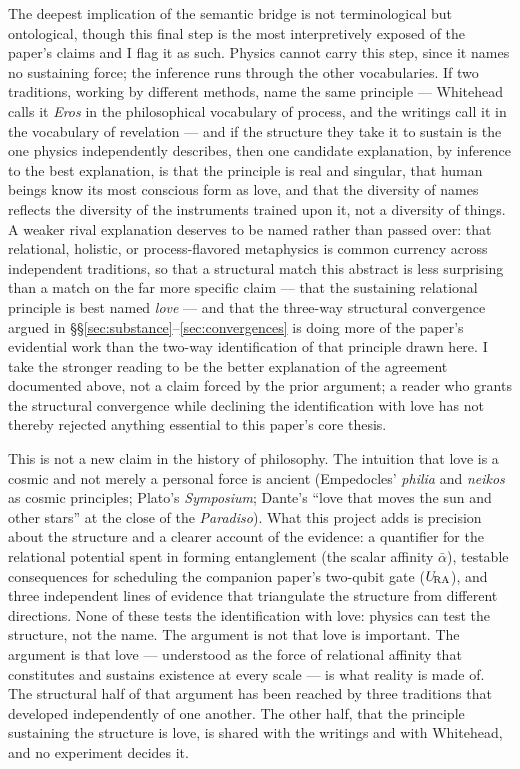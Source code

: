 The deepest implication of the semantic bridge is not terminological
but ontological, though this final step is the most interpretively
exposed of the paper's claims and I flag it as such.
Physics cannot carry this step, since it names no sustaining force; the
inference runs through the other vocabularies.
If two traditions, working by different methods, name the same
principle --- Whitehead calls it \emph{Eros} in the philosophical vocabulary of
process, and the \bahai writings call it \mahabbat in the vocabulary of
revelation --- and if the structure they take it to sustain is the one
physics independently describes, then one candidate explanation, by
inference to the best explanation, is that the principle is real and
singular, that human beings know its most conscious form as love, and
that the diversity of names reflects the diversity of the instruments
trained upon it, not a diversity of things.
A weaker rival explanation deserves to be named rather than passed over:
that relational, holistic, or process-flavored metaphysics is common
currency across independent traditions, so that a structural match
this abstract is less surprising than a match on the far more specific
claim --- that the sustaining relational principle is best named
\emph{love} --- and that the three-way structural convergence
argued in \S\S\ref{sec:substance}--\ref{sec:convergences} is
doing more of the paper's evidential work than the two-way
identification of that principle drawn here.
I take the stronger reading to be the better explanation of the agreement
documented above, not a claim forced by the prior argument; a reader who
grants the structural convergence while declining the identification with
love has not thereby rejected anything essential to this paper's core
thesis.

This is not a new claim in the history of philosophy.
The intuition that love is a cosmic and not merely a personal force is
ancient (Empedocles' \emph{philia} and \emph{neikos} as cosmic principles;
Plato's \emph{Symposium}; Dante's ``love that moves the sun and other
stars'' at the close of the \emph{Paradiso}).
What this project adds is precision about the structure and a clearer
account of the evidence: a quantifier for the relational potential spent
in forming entanglement (the scalar affinity $\bar\alpha$), testable
consequences for scheduling the companion paper's two-qubit gate
($U_{\!\mathrm{RA}}$), and three independent lines of evidence that triangulate the
structure from different directions.
None of these tests the identification with love: physics can test the
structure, not the name.
The argument is not that love is important.
The argument is that love --- understood as the force of relational affinity
that constitutes and sustains existence at every scale --- is what reality
is made of.
The structural half of that argument has been reached by three traditions
that developed independently of one another.
The other half, that the principle sustaining the structure is love, is
shared with the \bahai writings and with Whitehead, and no experiment
decides it.
